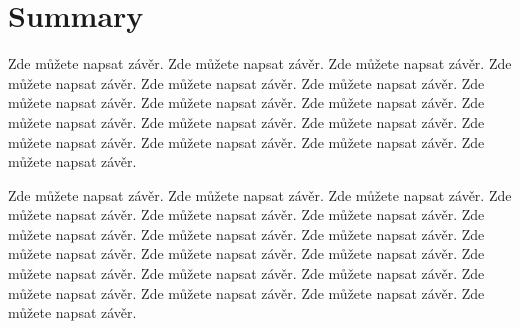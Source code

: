 \chapter*{Summary}

Zde můžete napsat závěr. Zde můžete napsat závěr. Zde můžete napsat závěr. Zde můžete napsat závěr. Zde můžete napsat
závěr. Zde můžete napsat závěr. Zde můžete napsat závěr. Zde můžete napsat závěr. Zde můžete napsat závěr. Zde můžete
napsat závěr. Zde můžete napsat závěr. Zde můžete napsat závěr. Zde můžete napsat závěr. Zde můžete napsat závěr. Zde
můžete napsat závěr. Zde můžete napsat závěr.

Zde můžete napsat závěr. Zde můžete napsat závěr. Zde můžete napsat závěr. Zde můžete napsat závěr. Zde můžete napsat
závěr. Zde můžete napsat závěr. Zde můžete napsat závěr. Zde můžete napsat závěr. Zde můžete napsat závěr. Zde můžete
napsat závěr. Zde můžete napsat závěr. Zde můžete napsat závěr. Zde můžete napsat závěr. Zde můžete napsat závěr. Zde
můžete napsat závěr. Zde můžete napsat závěr. Zde můžete napsat závěr. Zde můžete napsat závěr. Zde můžete napsat závěr.
